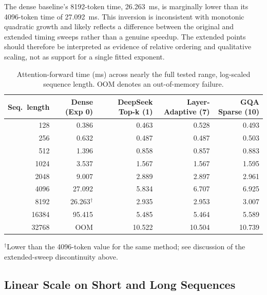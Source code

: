 \documentclass[11pt]{article}
\begin{document}
The dense baseline's 8192-token time, 26.263~ms, is marginally lower than its
4096-token time of 27.092~ms. This inversion is inconsistent with monotonic
quadratic growth and likely reflects a difference between the original and
extended timing sweeps rather than a genuine speedup. The extended points
should therefore be interpreted as evidence of relative ordering and
qualitative scaling, not as support for a single fitted exponent.

\begin{table}[ht]
  \centering
  \small
  \caption{Attention-forward time (ms) across nearly the full tested range,
  log-scaled sequence length. OOM denotes an out-of-memory failure.}
  \label{tab:loglog}
  \begin{tabular}{@{}rrrrr@{}}
    \toprule
    Seq.\ length & Dense (Exp 0) & DeepSeek Top-k (1) & Layer-Adaptive (7) & GQA Sparse (10) \\
    \midrule
    128    & 0.386 & 0.463 & 0.528 & 0.493 \\
    256    & 0.632 & 0.487 & 0.487 & 0.503 \\
    512    & 1.396 & 0.858 & 0.857 & 0.883 \\
    1024   & 3.537 & 1.567 & 1.567 & 1.595 \\
    2048   & 9.007 & 2.889 & 2.897 & 2.961 \\
    4096   & 27.092 & 5.834 & 6.707 & 6.925 \\
    8192   & 26.263$^\dagger$ & 2.935 & 2.953 & 3.007 \\
    16384  & 95.415 & 5.485 & 5.464 & 5.589 \\
    32768  & OOM & 10.522 & 10.504 & 10.739 \\
    \bottomrule
  \end{tabular}

  \vspace{4pt}
  \raggedright\footnotesize $^\dagger$Lower than the 4096-token value for the
  same method; see discussion of the extended-sweep discontinuity above.
\end{table}

\subsection{Linear Scale on Short and Long Sequences}
\end{document}

